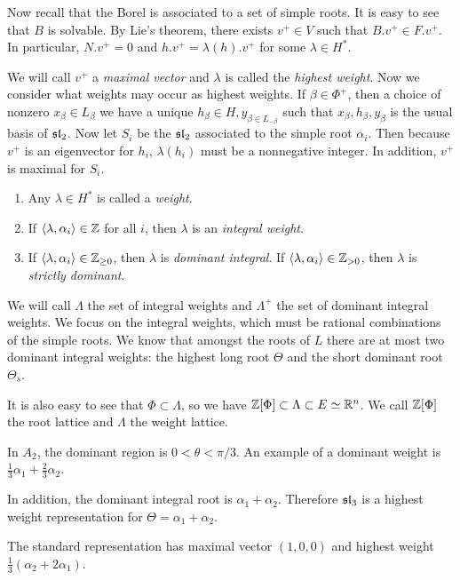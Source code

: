 \documentclass[twoside, 10pt]{article}
\begin{document}
    Now recall that the Borel is associated to a set of simple roots. It is easy to see that $B$ is solvable. By Lie's theorem, there exists $v^+ \in V$ such that $B.v^+ \in F.v^+$. In particular, $N.v^+ = 0$ and $h.v^+ = \lambda(h).v^+$ for some $\lambda \in H^*$.
    
    We will call $v^+$ a \textit{maximal vector} and $\lambda$ is called the \textit{highest weight}. Now we consider what weights may occur as highest weights. If $\beta \in \Phi^+$, then a choice of nonzero $x_{\beta} \in L_{\beta}$ we have a unique $h_{\beta} \in H, y_{\beta \in L_{-\beta}}$ such that $x_{\beta}, h_{\beta}, y_{\beta}$ is the usual basis of $\mathfrak{sl}_2$. Now let $S_i$ be the $\mathfrak{sl}_2$ associated to the simple root $\alpha_i$. Then because $v^+$ is an eigenvector for $h_i$, $\lambda(h_i)$ must be a nonnegative integer. In addition, $v^+$ is maximal for $S_i$.

    \begin{defn}
        \begin{enumerate}
            \item Any $\lambda \in H^*$ is called a \textit{weight}.
            \item If $\langle\lambda, \alpha_i\rangle \in \mathbb{Z}$ for all $i$, then $\lambda$ is an \textit{integral weight}.
            \item If $\langle\lambda, \alpha_i\rangle \in \mathbb{Z}_{\geq 0}$, then $\lambda$ is \textit{dominant integral}. If $\langle\lambda, \alpha_i\rangle \in \mathbb{Z}_{>0}$, then $\lambda$ is \textit{strictly dominant}.
        \end{enumerate}
    \end{defn}

    We will call $\Lambda$ the set of integral weights and $\Lambda^+$ the set of dominant integral weights. We focus on the integral weights, which must be rational combinations of the simple roots. We know that amongst the roots of $L$ there are at most two dominant integral weights: the highest long root $\Theta$ and the short dominant root $\Theta_s$.

    It is also easy to see that $\Phi \subset \Lambda$, so we have $\mathbb{Z}[\Phi] \subset \Lambda \subset E \simeq \mathbb{R}^n$. We call $\mathbb{Z}[\Phi]$ the root lattice and $\Lambda$ the weight lattice.

    \begin{exm}
        In $A_2$, the dominant region is $0 < \theta < \pi/3$. An example of a dominant weight is $\frac{1}{3} \alpha_1 + \frac{2}{3} \alpha_2$.

        In addition, the dominant integral root is $\alpha_1 + \alpha_2$. Therefore $\mathfrak{sl}_3$ is a highest weight representation for $\Theta = \alpha_1 + \alpha_2$.

        The standard representation has maximal vector $(1,0,0)$ and highest weight $\frac{1}{3} (\alpha_2 + 2 \alpha_1)$.
    \end{exm}
\end{document}
